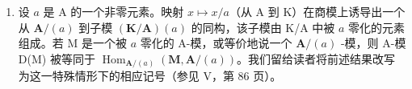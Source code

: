 \begin{enumerate}
\def\labelenumi{\arabic{enumi})}
\setcounter{enumi}{1}
\tightlist
\item
  设 \(a\) 是 A 的一个非零元素。映射 \(x \mapsto x/a\)（从 A 到 K）在商模上诱导出一个从 \(\mathbf{A}/(a)\) 到子模 \((\mathbf{K}/\mathbf{A})(a)\) 的同构，该子模由 K/A 中被 \(a\) 零化的元素组成。若 M 是一个被 \(a\) 零化的 A-模，或等价地说一个 \(\mathbf{A}/(a)\) -模，则 A-模 D(M) 被等同于 \(\operatorname{Hom}_{\mathbf{A}/(a)}(\mathbf{M}, \mathbf{A}/(a))\)。我们留给读者将前述结果改写为这一特殊情形下的相应记号（参见 V，第 86 页）。
\end{enumerate}

